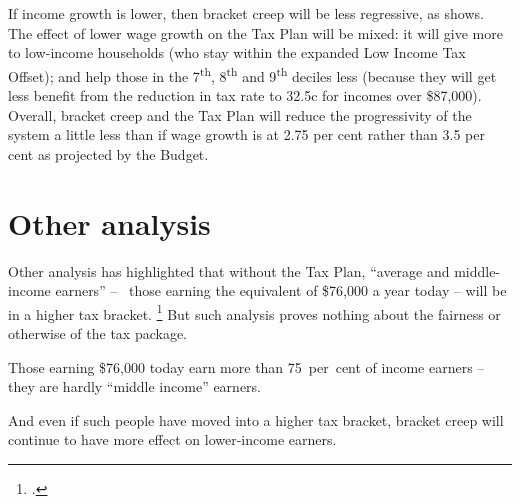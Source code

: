 \documentclass[submission]{grattan}\usepackage[]{graphicx}\usepackage[]{color}
\begin{document}
If income growth is lower, then bracket creep will be less regressive, as  shows. The effect of lower wage growth on the Tax Plan will be mixed: it will give more to low-income households (who stay within the expanded Low Income Tax Offset); and help those in the 7\textsuperscript{th}, 8\textsuperscript{th} and 9\textsuperscript{th} deciles less (because they will get less benefit from the reduction in tax rate to 32.5c for incomes over \$87,000). Overall, bracket creep and the Tax Plan will reduce the progressivity of the system a little less than if wage growth is at 2.75 per cent rather than 3.5 per cent as projected by the Budget.

\section{Other analysis}\label{sec:other-analysis}

Other analysis has highlighted that without the Tax Plan, ``average and middle-income earners'' -- \ie~those earning the equivalent of \$76,000 a year today -- will be in a higher tax bracket.
  \footcite{Benson}
But such analysis proves nothing about the fairness or otherwise of the tax package.

Those earning \$76,000 today earn more than 75~per~cent of income earners -- they are hardly ``middle income'' earners.

And even if such people have moved into a higher tax bracket, bracket creep will continue to have more effect on lower-income earners.

\vspace{3\baselineskip}
\end{document}
